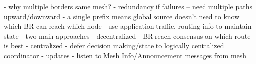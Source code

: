 \if
- why multiple borders same mesh?
    - redundancy if failures -- need multiple paths upward/downward
    - a single prefix means global source doesn't need to know which BR can reach which node
    - use application traffic, routing info to maintain state
- two main approaches
    - decentralized
        - BR reach consensus on which route is best
    - centralized
        - defer decision making/state to logically centralized coordinator
- updates
    - listen to Mesh Info/Announcement messages from mesh
\fi